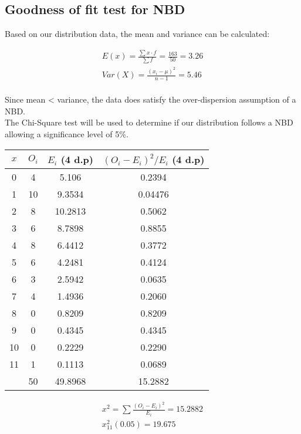 \documentclass{article}
\begin{document}
\subsection{Goodness of fit test for NBD}
Based on our distribution data, the mean and variance can be calculated:

\begin{gather*}
  E(x) = \frac{\sum x \cdot f}{\sum f} = \frac{163}{50} = 3.26 \\[5pt]
  Var(X) = \frac{(x_i - \mu)^2}{n - 1} = 5.46 \\[5pt]
\end{gather*}

Since mean < variance, the data does satisfy the over-dispersion 
assumption of a NBD.\\

The Chi-Square test will be used to determine if our distribution
follows a NBD allowing a significance level of 5\%.

\begin{center}
  \begin{tabular}{|c|c|c|c|}
    \hline
    $x$ & $O_i$ & $ E_i $ (4 d.p) & $ (O_i - E_i)^2 / E_i $ (4 d.p) \\
    \hline 
    \hline 
    0  & 4  & 5.106   & 0.2394 \\
    1  & 10 & 9.3534  & 0.04476 \\
    2  & 8  & 10.2813 & 0.5062 \\
    3  & 6  & 8.7898  & 0.8855 \\
    4  & 8  & 6.4412  & 0.3772 \\
    5  & 6  & 4.2481  & 0.4124 \\
    6  & 3  & 2.5942  & 0.0635 \\
    7  & 4  & 1.4936  & 0.2060 \\
    8  & 0  & 0.8209  & 0.8209 \\
    9  & 0  & 0.4345  & 0.4345 \\
    10 & 0  & 0.2229  & 0.2290 \\
    11 & 1  & 0.1113  & 0.0689 \\
    \hline
    \hline
       & 50 & 49.8968 & 15.2882  \\
    \hline
  \end{tabular}
\end{center}

\begin{gather*}
  x^2 = \sum \frac{(O_i - E_i)^2}{E_i} = 15.2882 \\[5pt]
  x^2_{11} (0.05) = 19.675 \\[5pt]
\end{gather*}
\end{document}
